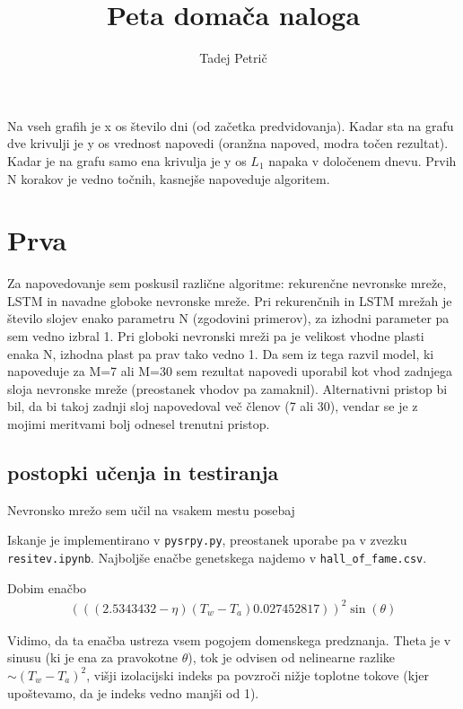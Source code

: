 \documentclass{article}
\begin{document}
\title{Peta domača naloga}
\author{Tadej Petrič}
\maketitle
Na vseh grafih je x os število dni (od začetka predvidovanja). Kadar sta na grafu dve krivulji je y os vrednost napovedi (oranžna napoved, modra točen rezultat). Kadar je na grafu samo ena krivulja je y os \(L_1\) napaka v določenem dnevu. Prvih N korakov je vedno točnih, kasnejše napoveduje algoritem.

\section{Prva}
Za napovedovanje sem poskusil različne algoritme: rekurenčne nevronske mreže, LSTM in navadne globoke nevronske mreže. Pri rekurenčnih in LSTM mrežah je število slojev enako parametru N (zgodovini primerov), za izhodni parameter pa sem vedno izbral 1. Pri globoki nevronski mreži pa je velikost vhodne plasti enaka N, izhodna plast pa prav tako vedno 1. Da sem iz tega razvil model, ki napoveduje za M=7 ali M=30 sem rezultat napovedi uporabil kot vhod zadnjega sloja nevronske mreže (preostanek vhodov pa zamaknil). Alternativni pristop bi bil, da bi takoj zadnji sloj napovedoval več členov (7 ali 30), vendar se je z mojimi meritvami bolj odnesel trenutni pristop.

\subsection*{postopki učenja in testiranja}
Nevronsko mrežo sem učil na vsakem mestu posebaj 

Iskanje je implementirano v \texttt{pysrpy.py}, preostanek uporabe pa v zvezku \texttt{resitev.ipynb}. Najboljše enačbe genetskega najdemo v \texttt{hall\_of\_fame.csv}.

Dobim enačbo 
\begin{align*}
    \left(((2.5343432-\eta)(T_w-T_a)0.027452817)\right)^2 \sin(\theta)
\end{align*}

Vidimo, da ta enačba ustreza vsem pogojem domenskega predznanja. Theta je v sinusu (ki je ena za pravokotne \(\theta\)), tok je odvisen od nelinearne razlike \(\sim (T_w-T_a)^2\), višji izolacijski indeks pa povzroči nižje toplotne tokove (kjer upoštevamo, da je indeks vedno manjši od 1).
\end{document}
